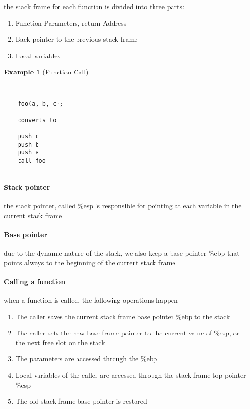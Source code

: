 \documentclass[openright, twoside]{report}
\theoremstyle{definition}
\theoremstyle{example}
\newtheorem{example}{Example}[section]
\begin{document}
				the stack frame for each function is divided into three parts:
				\begin{enumerate}
					\item Function Parameters, return Address
					\item Back pointer to the previous stack frame 
					\item Local variables
				\end{enumerate}
				
				\begin{example}[Function Call]
					\begin{lstlisting}
	

	foo(a, b, c);

	converts to

	push c
	push b
	push a
	call foo
					
					\end{lstlisting}
				\end{example}

				\paragraph{Stack pointer} the stack pointer, called \%esp
				is responsible for pointing at each variable in the current stack frame 
				

				\paragraph{Base pointer}due to the dynamic nature of the stack, we also keep 
				a base pointer \%ebp
				that points always to the beginning of the current stack frame

				\paragraph{Calling a function} when a function is called, the following 
				operations happen
				\begin{enumerate}
					\item The caller saves the current stack frame base pointer \%ebp to the stack
					\item The caller sets the new base frame pointer to the current value of \%esp, or the next free slot on the stack 
					\item The parameters are accessed through the \%ebp
					\item Local variables of the caller are accessed through the stack frame top pointer \%esp
					\item The old stack frame base pointer is restored 
				\end{enumerate}
\end{document}
